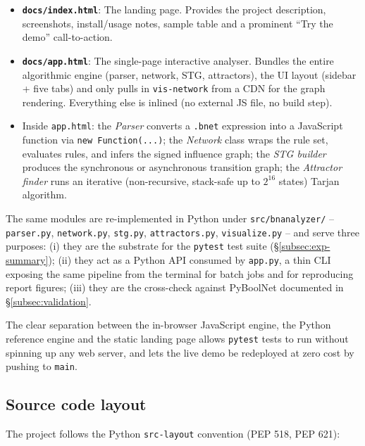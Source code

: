 \documentclass[oneside,final]{hcmut-report}
\begin{document}
\begin{itemize}[leftmargin=*]
    \item \textbf{\texttt{docs/index.html}}: The landing page. Provides the project description, screenshots, install/usage notes, sample table and a prominent ``Try the demo'' call-to-action.
    \item \textbf{\texttt{docs/app.html}}: The single-page interactive analyser. Bundles the entire algorithmic engine (parser, network, STG, attractors), the UI layout (sidebar + five tabs) and only pulls in \texttt{vis-network} from a CDN for the graph rendering. Everything else is inlined (no external JS file, no build step).
    \item Inside \texttt{app.html}: the \textit{Parser} converts a \texttt{.bnet} expression into a JavaScript function via \texttt{new Function(...)}; the \textit{Network} class wraps the rule set, evaluates rules, and infers the signed influence graph; the \textit{STG builder} produces the synchronous or asynchronous transition graph; the \textit{Attractor finder} runs an iterative (non-recursive, stack-safe up to $2^{16}$ states) Tarjan algorithm.
\end{itemize}

The same modules are re-implemented in Python under \texttt{src/bnanalyzer/} -- \texttt{parser.py}, \texttt{network.py}, \texttt{stg.py}, \texttt{attractors.py}, \texttt{visualize.py} -- and serve three purposes: (i) they are the substrate for the \texttt{pytest} test suite (\S\ref{subsec:exp-summary}); (ii) they act as a Python API consumed by \texttt{app.py}, a thin CLI exposing the same pipeline from the terminal for batch jobs and for reproducing report figures; (iii) they are the cross-check against PyBoolNet documented in \S\ref{subsec:validation}.

The clear separation between the in-browser JavaScript engine, the Python reference engine and the static landing page allows \texttt{pytest} tests to run without spinning up any web server, and lets the live demo be redeployed at zero cost by pushing to \texttt{main}.

\subsection{Source code layout}\label{subsec:layout}

The project follows the Python \texttt{src-layout} convention (PEP 518, PEP 621):
\end{document}
